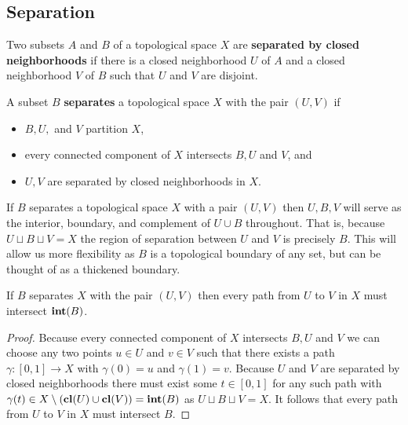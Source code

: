 
\subsection{Separation}


\begin{definition}[Separated]
  Two subsets $A$ and $B$ of a topological space $X$ are \textbf{separated by closed neighborhoods} if there is a closed neighborhood $U$ of $A$ and a closed neighborhood $V$ of $B$ such that $U$ and $V$ are disjoint.
\end{definition}

\begin{definition}[Separation]
  A subset $B$ \textbf{separates} a topological space $X$ with the pair $(U, V)$ if
  \begin{itemize}
    \item $B, U,$ and $V$ partition $X$,
    \item every connected component of $X$ intersects $B, U$ and $V$, and
    \item $U, V$ are separated by closed neighborhoods in $X$.%
  \end{itemize}
\end{definition}

If $B$ separates a topological space $X$ with a pair $(U, V)$ then $U, B, V$ will serve as the interior, boundary, and complement of $U\cup B$ throughout.
That is, because $U\sqcup B\sqcup V = X$ the region of separation between $U$ and $V$ is precisely $B$.
This will allow us more flexibility as $B$ is a topological boundary of any set, but can be thought of as a thickened boundary.

\begin{lemma}\label{lem:separate_path}
  If $B$ separates $X$ with the pair $(U, V)$ then every path from $U$ to $V$ in $X$ must intersect $\mathbf{int}(B)$.
\end{lemma}
\begin{proof}
  Because every connected component of $X$ intersects $B, U$ and $V$ we can choose any two points $u\in U$ and $v\in V$ such that there exists a path $\gamma : [0,1]\to X$ with $\gamma(0) = u$ and $\gamma(1) = v$.
  Because $U$ and $V$ are separated by closed neighborhoods there must exist some $t\in[0,1]$ for any such path with $\gamma(t)\in X\setminus(\mathbf{cl}(U)\cup \mathbf{cl}(V)) = \mathbf{int}(B)$ as $U\sqcup B\sqcup V = X$.
  It follows that every path from $U$ to $V$ in $X$ must intersect $B$.
\end{proof}

